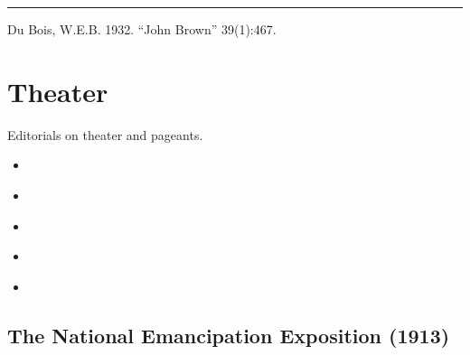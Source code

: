 \documentclass[letterpaper,10pt,english]{jupyterBook}
\begin{document}
\bigskip\hrule\bigskip


\sphinxAtStartPar
{} Du Bois, W.E.B. 1932. “John Brown” 39(1):467.


\section{Theater}
\label{\detokenize{Sections/theater:theater}}\label{\detokenize{Sections/theater::doc}}
\sphinxAtStartPar
Editorials on theater and pageants.
\begin{itemize}
\item {} 
\sphinxAtStartPar
{\hyperref[\detokenize{Volumes/06/07/national_emancipation_exposition::doc}]{}}

\item {} 
\sphinxAtStartPar
{\hyperref[\detokenize{Volumes/11/02/star_of_ethiopia::doc}]{}}

\item {} 
\sphinxAtStartPar
{\hyperref[\detokenize{Volumes/12/03/drama_among_black_folk::doc}]{}}

\item {} 
\sphinxAtStartPar
{\hyperref[\detokenize{Volumes/32/03/kgriwa::doc}]{}}

\item {} 
\sphinxAtStartPar
{\hyperref[\detokenize{Volumes/32/06/criteria_of_negro_art::doc}]{}}

\end{itemize}


\subsection{The National Emancipation Exposition (1913)}
\label{\detokenize{Volumes/06/07/national_emancipation_exposition:the-national-emancipation-exposition-1913}}\label{\detokenize{Volumes/06/07/national_emancipation_exposition::doc}}
\sphinxAtStartPar
{}

\sphinxAtStartPar
{}
\end{document}
